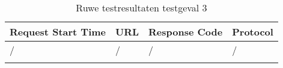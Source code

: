 \begin{longtable}[c]{@{}llll@{}}
    \toprule
    Request Start Time & URL & Response Code & Protocol \\* \midrule
    \endhead
    / & / & / & / \\* \bottomrule
    \caption{Ruwe testresultaten testgeval 3}
    \label{tab:rawresults-3}\\
\end{longtable}